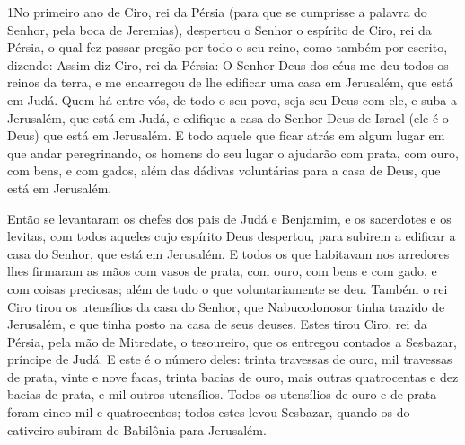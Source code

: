 
\lettrine{1} No primeiro ano de Ciro, rei da Pérsia (para que
se cumprisse a palavra do Senhor, pela boca de Jeremias), despertou
o Senhor o espírito de Ciro, rei da Pérsia, o qual fez passar pregão
por todo o seu reino, como também por escrito, dizendo: Assim
diz Ciro, rei da Pérsia: O Senhor Deus dos céus me deu todos os
reinos da terra, e me encarregou de lhe edificar uma casa em
Jerusalém, que está em Judá. Quem há entre vós, de todo o seu
povo, seja seu Deus com ele, e suba a Jerusalém, que está em Judá, e
edifique a casa do Senhor Deus de Israel (ele é o Deus) que está em
Jerusalém. E todo aquele que ficar atrás em algum lugar em que
andar peregrinando, os homens do seu lugar o ajudarão com prata, com
ouro, com bens, e com gados, além das dádivas voluntárias para a
casa de Deus, que está em Jerusalém.

Então se levantaram os chefes dos pais de Judá e Benjamim, e os
sacerdotes e os levitas, com todos aqueles cujo espírito Deus
despertou, para subirem a edificar a casa do Senhor, que está em
Jerusalém. E todos os que habitavam nos arredores lhes firmaram
as mãos com vasos de prata, com ouro, com bens e com gado, e com
coisas preciosas; além de tudo o que voluntariamente se deu.
Também o rei Ciro tirou os utensílios da casa do Senhor, que
Nabucodonosor tinha trazido de Jerusalém, e que tinha posto na casa
de seus deuses. Estes tirou Ciro, rei da Pérsia, pela mão de
Mitredate, o tesoureiro, que os entregou contados a Sesbazar,
príncipe de Judá. E este é o número deles: trinta travessas de
ouro, mil travessas de prata, vinte e nove facas, trinta
bacias de ouro, mais outras quatrocentas e dez bacias de prata, e
mil outros utensílios. Todos os utensílios de ouro e de prata
foram cinco mil e quatrocentos; todos estes levou Sesbazar, quando
os do cativeiro subiram de Babilônia para Jerusalém.

\medskip

